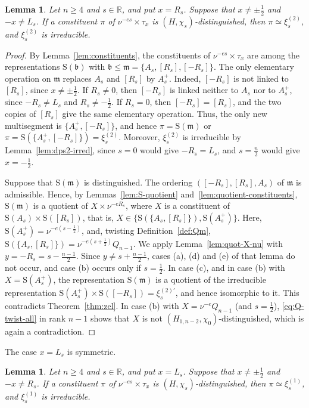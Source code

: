 \documentclass[11pt]{amsart}
\numberwithin{equation}{section}
\theoremstyle{plain}
\newtheorem{lemma}[theorem]{Lemma}
\theoremstyle{definition}
\theoremstyle{remark}
\newcommand{\R}{\mathbb{R}}
\newcommand{\xione}{\xi^{(1)}}
\newcommand{\xitwo}{\xi^{(2)}}
\newcommand{\mm}{\mathfrak{m}}
\newcommand{\bb}{\mathfrak{b}}
\newcommand{\Ss}{\mathrm{S}}
\begin{document}
\begin{lemma}\label{lem:constituents-R}
	Let $n\ge4$ and $s\in\R$, and put $x=R_s$. Suppose that $x\ne\pm\frac12$ and $-x\ne L_s$. If a constituent $\pi$ of $\nu^{-es}\times\tau_x$ is $(H,\chi_s)$-distinguished, then $\pi\simeq\xitwo_s$, and $\xitwo_s$ is irreducible.
\end{lemma}

\begin{proof}
	By Lemma~\ref{lem:constituents}, the constituents of $\nu^{-es}\times\tau_x$ are among the representations $\Ss(\bb)$ with $\bb\le\mm=\{A_s,[R_s],[-R_s]\}$. The only elementary operation on $\mm$ replaces $A_s$ and $[R_s]$ by $A_s^+$. Indeed, $[-R_s]$ is not linked to $[R_s]$, since $x\ne\pm\frac12$. If $R_s\ne0$, then $[-R_s]$ is linked neither to $A_s$ nor to $A_s^+$, since $-R_s\ne L_s$ and $R_s\ne-\frac12$. If $R_s=0$, then $[-R_s]=[R_s]$, and the two copies of $[R_s]$ give the same elementary operation. Thus, the only new multisegment is $\{A_s^+,[-R_s]\}$, and hence $\pi=\Ss(\mm)$ or $\pi=\Ss(\{A_s^+,[-R_s]\})=\xitwo_s$. Moreover, $\xitwo_s$ is irreducible by Lemma~\ref{lem:dps2-irred}, since $s=0$ would give $-R_s=L_s$, and $s=\frac n2$ would give $x=-\frac12$.
	
	Suppose that $\Ss(\mm)$ is distinguished. The ordering $([-R_s],[R_s],A_s)$ of $\mm$ is admissible. Hence, by Lemmas~\ref{lem:S-quotient} and~\ref{lem:quotient-constituents}, $\Ss(\mm)$ is a quotient of $X\times\nu^{-eR_s}$, where $X$ is a constituent of $\Ss(A_s)\times\Ss([R_s])$, that is, $X\in\{\Ss(\{A_s,[R_s]\}),\Ss(A_s^+)\}$. Here, $\Ss(A_s^+)=\nu^{-e(s-\frac12)}$, and, twisting Definition~\ref{def:Qm}, $\Ss(\{A_s,[R_s]\})=\nu^{-e(s+\frac12)}Q_{n-1}$. We apply Lemma~\ref{lem:quot-X-nu} with $y=-R_s=s-\frac{n-1}2$. Since $y\ne s+\frac{n-1}2$, cases (a), (d) and (e) of that lemma do not occur, and case (b) occurs only if $s=\frac12$. In case (c), and in case (b) with $X=\Ss(A_s^+)$, the representation $\Ss(\mm)$ is a quotient of the irreducible representation $\Ss(A_s^+)\times\Ss([-R_s])=\xi^{(2)\prime}_s$, and hence isomorphic to it. This contradicts Theorem~\ref{thm:zel}. In case (b) with $X=\nu^{-e}Q_{n-1}$ (and $s=\frac12$), \eqref{eq:Q-twist-all} in rank $n-1$ shows that $X$ is not $(H_{1,n-2},\chi_0)$-distinguished, which is again a contradiction.
\end{proof}

The case $x=L_s$ is symmetric.

\begin{lemma}\label{lem:constituents-L}
	Let $n\ge4$ and $s\in\R$, and put $x=L_s$. Suppose that $x\ne\pm\frac12$ and $-x\ne R_s$. If a constituent $\pi$ of $\nu^{-es}\times\tau_x$ is $(H,\chi_s)$-distinguished, then $\pi\simeq\xione_s$, and $\xione_s$ is irreducible.
\end{lemma}
\end{document}
